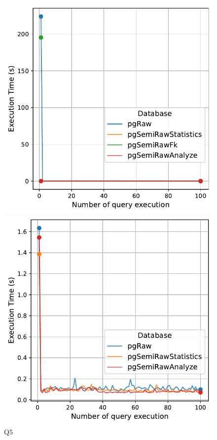 \begin{figure}[h!]
\centering
\begin{minipage}[b]{0.45\linewidth}
    \centering
    \includegraphics[width=1.0\linewidth]{charts-eval-exp-time-stat/execution_time_db_type_Q5.pdf}
    \caption*{Q5}
\end{minipage}
\hfill
\begin{minipage}[b]{0.45\linewidth}
    \centering
    \includegraphics[width=1.0\linewidth]{charts-eval-exp-time-stat/execution_time_db_type_Q6.pdf}

\end{minipage}
\end{figure}
